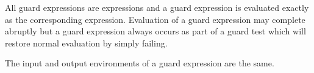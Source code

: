 \EVALUATION

All guard expressions are expressions and a guard expression is
evaluated exactly as the corresponding expression.  Evaluation of a
guard expression may complete abruptly but a guard expression always
occurs as part of a guard test which will restore normal evaluation
by simply failing.

\ENVIRONMENTS

The input and output environments of a guard expression are the same.
